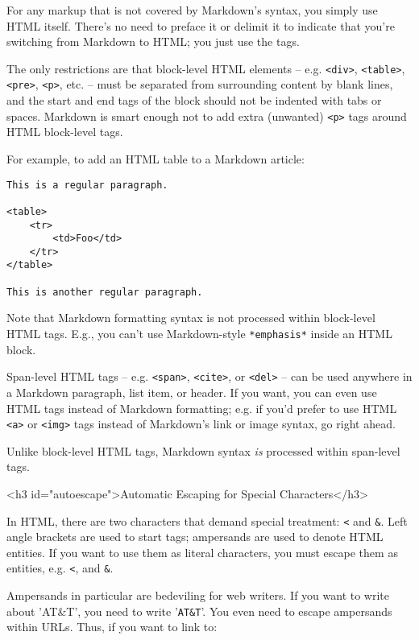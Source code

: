 For any markup that is not covered by Markdown's syntax, you simply
use HTML itself. There's no need to preface it or delimit it to
indicate that you're switching from Markdown to HTML; you just use
the tags.



The only restrictions are that block-level HTML elements -- e.g. \texttt{<div>},
\texttt{<table>}, \texttt{<pre>}, \texttt{<p>}, etc. -- must be separated from surrounding
content by blank lines, and the start and end tags of the block should
not be indented with tabs or spaces. Markdown is smart enough not
to add extra (unwanted) \texttt{<p>} tags around HTML block-level tags.



For example, to add an HTML table to a Markdown article:

\begin{lstlisting}
This is a regular paragraph.

<table>
    <tr>
        <td>Foo</td>
    </tr>
</table>

This is another regular paragraph.
\end{lstlisting}




Note that Markdown formatting syntax is not processed within block-level
HTML tags. E.g., you can't use Markdown-style \texttt{*emphasis*} inside an
HTML block.



Span-level HTML tags -- e.g. \texttt{<span>}, \texttt{<cite>}, or \texttt{<del>} -- can be
used anywhere in a Markdown paragraph, list item, or header. If you
want, you can even use HTML tags instead of Markdown formatting; e.g. if
you'd prefer to use HTML \texttt{<a>} or \texttt{<img>} tags instead of Markdown's
link or image syntax, go right ahead.



Unlike block-level HTML tags, Markdown syntax \emph{is} processed within
span-level tags.

<h3 id="autoescape">Automatic Escaping for Special Characters</h3>



In HTML, there are two characters that demand special treatment: \texttt{<}
and \texttt{\&}. Left angle brackets are used to start tags; ampersands are
used to denote HTML entities. If you want to use them as literal
characters, you must escape them as entities, e.g. \texttt{<}, and
\texttt{\&}.



Ampersands in particular are bedeviling for web writers. If you want to
write about 'AT\&T', you need to write '\texttt{AT\&T}'. You even need to
escape ampersands within URLs. Thus, if you want to link to:

